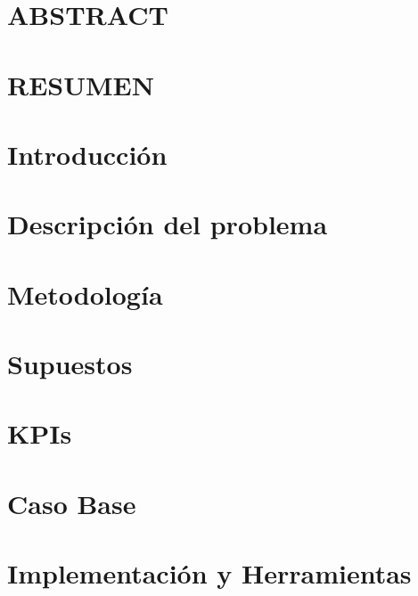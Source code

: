 \documentclass[pdftex,spanish]{pucthesis}	%
\begin{document}


 \label{abstract}
\chapter*{ABSTRACT}

\cleardoublepage

 \label{resumen}
\chapter*{RESUMEN}

\cleardoublepage



\chapter{Introducción}


\chapter{Descripción del problema}


\chapter{Metodología}


\chapter{Supuestos}


\chapter{KPIs}


\chapter{Caso Base}


\chapter{Implementación y Herramientas}

\end{document}
